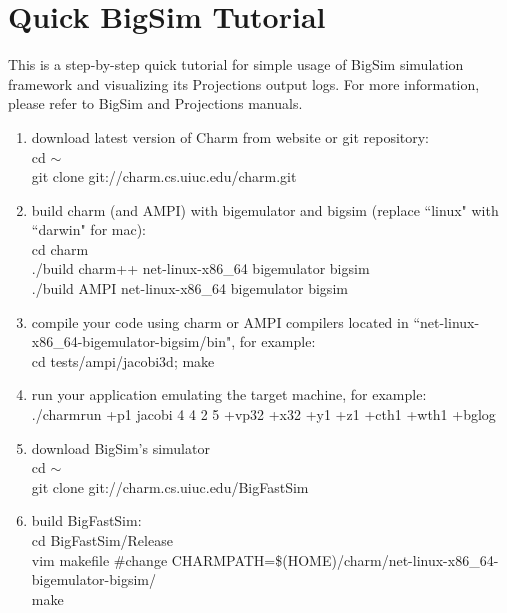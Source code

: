 \section{Quick BigSim Tutorial}
\label{sec:bigtutor}

This is a step-by-step quick tutorial for simple usage of BigSim simulation framework and visualizing its Projections output logs.
For more information, please refer to BigSim and Projections manuals.

\begin{enumerate}

\item download latest version of Charm from website or git repository:\\
        cd $\sim$ \\
        git clone git://charm.cs.uiuc.edu/charm.git\\

\item build charm (and AMPI) with bigemulator and bigsim (replace ``linux" with ``darwin" for mac):\\
        cd charm\\
        ./build charm++ net-linux-x86\_64 bigemulator bigsim\\
        ./build AMPI net-linux-x86\_64 bigemulator bigsim\\

\item compile your code using charm or AMPI compilers located in ``net-linux-x86\_64-bigemulator-bigsim/bin", for example:\\
        cd tests/ampi/jacobi3d; make\\

\item run your application emulating the target machine, for example:\\
        ./charmrun +p1 jacobi 4 4 2 5 +vp32 +x32 +y1 +z1 +cth1 +wth1 +bglog\\

\item download BigSim's simulator\\
        cd $\sim$\\
        git clone git://charm.cs.uiuc.edu/BigFastSim\\

\item build BigFastSim:\\
        cd BigFastSim/Release\\
        vim makefile  \#change CHARMPATH=\$(HOME)/charm/net-linux-x86\_64-bigemulator-bigsim/\\
        make\\


\end{enumerate}
